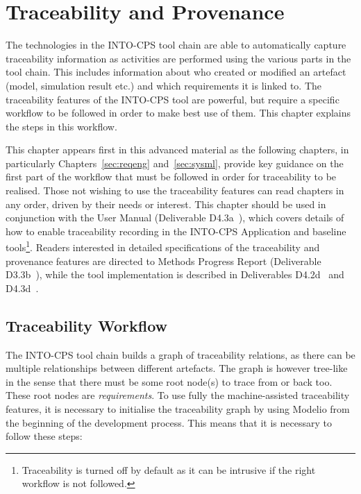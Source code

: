 \chapter{Traceability and Provenance}
\label{sec:trace}

The technologies in the INTO-CPS tool chain are able to automatically capture traceability information as activities are performed using the various parts in the tool chain. This includes information about who created or modified an artefact (model, simulation result etc.) and which requirements it is linked to. The traceability features of the INTO-CPS tool are powerful, but require a specific workflow to be followed in order to make best use of them. This chapter explains the steps in this workflow.

This chapter appears first in this advanced material as the following chapters, in particularly Chapters~\ref{sec:reqeng} and~\ref{sec:sysml}, provide key guidance on the first part of the workflow that must be followed in order for traceability to be realised. Those not wishing to use the traceability features can read chapters in any order, driven by their needs or interest. This chapter should be used in conjunction with the User Manual (Deliverable D4.3a~\cite{INTOCPSD4.3a}), which covers details of how to enable traceability recording in the INTO-CPS Application and baseline tools\footnote{Traceability is turned off by default as it can be intrusive if the right workflow is not followed.}. Readers interested in detailed specifications of the traceability and provenance features are directed to Methods Progress Report (Deliverable D3.3b~\cite{INTOCPSD3.3b}), while the tool implementation is described in Deliverables D4.2d~\cite{INTOCPSD4.2d} and D4.3d~\cite{INTOCPSD4.3d}.


\section{Traceability Workflow}

The INTO-CPS tool chain builds a graph of traceability relations, as there can be multiple relationships between different artefacts. The graph is however tree-like in the sense that there must be some root node(s) to trace from or back too. These root nodes are \emph{requirements}. To use fully the machine-assisted traceability features, it is necessary to initialise the traceability graph by using Modelio from the beginning of the development process. This means that it is necessary to follow these steps:

